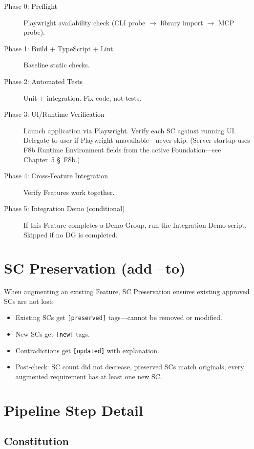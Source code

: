 \documentclass[11pt,a4paper,openright,twoside]{report}
\begin{document}
\begin{description}
  \item[Phase 0: Preflight] Playwright availability check (CLI probe $\rightarrow$ library import $\rightarrow$ MCP probe).
  \item[Phase 1: Build + TypeScript + Lint] Baseline static checks.
  \item[Phase 2: Automated Tests] Unit + integration. Fix code, not tests.
  \item[Phase 3: UI/Runtime Verification] Launch application via Playwright. Verify each SC against running UI. Delegate to user if Playwright unavailable---never skip. (Server startup uses F8b Runtime Environment fields from the active Foundation---see Chapter~5 \S~F8b.)
  \item[Phase 4: Cross-Feature Integration] Verify Features work together.
  \item[Phase 5: Integration Demo (conditional)] If this Feature completes a Demo Group, run the Integration Demo script. Skipped if no DG is completed.
\end{description}

\section{SC Preservation (add --to)}

When augmenting an existing Feature, SC Preservation ensures existing approved SCs are not lost:

\begin{itemize}
  \item Existing SCs get \texttt{[preserved]} tags---cannot be removed or modified.
  \item New SCs get \texttt{[new]} tags.
  \item Contradictions get \texttt{[updated]} with explanation.
  \item Post-check: SC count did not decrease, preserved SCs match originals, every augmented requirement has at least one new SC.
\end{itemize}

\section{Pipeline Step Detail}

\subsection{Constitution}
\end{document}

